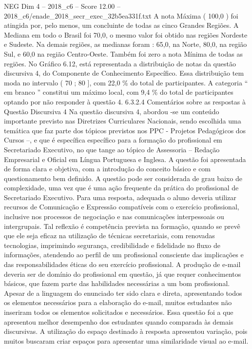 \begin{textsample}{NEG Dim 4 – 2018\_c6 – Score 12.00 – 2018\_c6/enade\_2018\_secr\_exec\_32b5ea331f.txt}
A nota Máxima ( 100,0 ) foi atingida por, pelo menos, um concluinte de todas as cinco Grandes Regiões.
A Mediana em todo o Brasil foi 70,0, o mesmo valor foi obtido nas regiões Nordeste e Sudeste.
Na demais regiões, as medianas foram : 65,0, na Norte, 80,0, na região Sul, e 60,0 na região Centro-Oeste.
Também foi zero a nota Mínima de todas as regiões.
No Gráfico 6.12, está representada a distribuição de notas da questão discursiva 4, do Componente de Conhecimento Específico.
Essa distribuição tem moda no intervalo ( 70 ; 80 ], com 22,0 \% do total de participantes.
A categoria “ em branco ” constitui um máximo local, com 9,4 \% do total de participantes optando por não responder à questão 4. 6.3.2.4 Comentários sobre as respostas à Questão Discursiva 4 Na questão discursiva 4, abordou -se um conteúdo importante previsto nas Diretrizes Curriculares Nacionais, sendo escolhida uma temática que faz parte dos tópicos previstos nos PPC - Projetos Pedagógicos dos Cursos –, e que é específica específico para a formação do profissional em Secretariado Executivo, no que tange ao tópico de Assessoria – Redação Empresarial e Oficial em Língua Portuguesa e Inglesa.
A questão foi apresentada de forma clara e objetiva, com a introdução do conceito básico e com questionamento bem definido.
A questão pode ser considerada de grau baixo de complexidade, uma vez que é uma ação frequente da prática do profissional de Secretariado Executivo.
Para uma resposta, adequada o aluno deveria utilizar recursos de Comunicação e Expressão compatíveis com o exercício profissional, inclusive nos processos de negociação e nas comunicações interpessoais ou intergrupais.
Tal reflexão é competência prevista na formação, quando se prevê que ele seja eficaz na utilização de técnicas secretariais, com renovadas tecnologias, imprimindo segurança, credibilidade e fidelidade no fluxo de informações, atendendo ao perfil de um profissional consciente das implicações e das responsabilidades éticas do seu exercício profissional.
A produção de e-mail deveria ser de domínio do profissional em questão, já que requer conhecimentos básicos, que fazem parte das habilidades necessárias a um bom profissional.
Apesar de a linguagem do enunciado ter sido clara e direta, apresentando todos os elementos necessários para a elaboração do e-mail, muitos estudantes não inseriram todos os elementos solicitados e necessários.
Essa questão foi a que apresentou melhor desempenho dos estudantes quando comparada às demais discursivas.
A utilização do espaço destinado à resposta apresentou variação, pois muitos buscaram criar espaços para apresentar uma similaridade visual ao e-mail.

\end{textsample}
